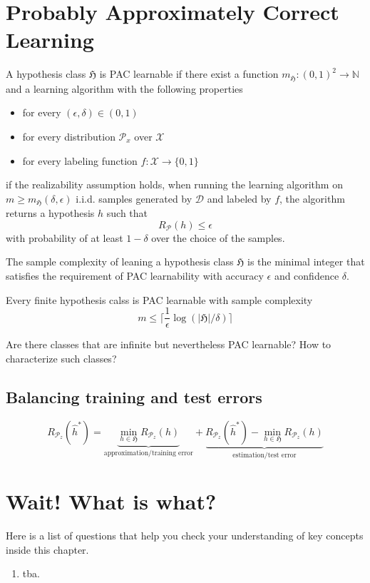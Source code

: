 \section{Probably Approximately Correct Learning}
    \begin{definition}
		A hypothesis class $\mathfrak{H}$ is PAC learnable if there exist a
		function $m_\mathfrak{H}: (0,1)^2 \to \mathbb{N}$ and a learning
		algorithm with the following properties
		\begin{itemize}
			\item for every $(\epsilon, \delta) \in (0,1)$
			\item for every distribution $\mathcal{P}_x$ over $\mathcal{X}$
			\item for every labeling function $f: \mathcal{X} \to \{0,1\}$
		\end{itemize}
		if the realizability assumption holds, when running the learning
		algorithm on $m \geq m_\mathfrak{H}(\delta, \epsilon)$ i.i.d. samples
		generated by $\mathcal{D}$ and labeled by $f$, the algorithm returns a
		hypothesis $h$ such that 
		$$
		R_\mathcal{P}(h) \leq \epsilon
		$$ 
		with probability of at least $1-\delta$ over the choice of the samples.
	\end{definition}

    \begin{definition}
		The sample complexity of leaning a hypothesis class $\mathfrak{H}$ is
		the minimal integer that satisfies the requirement of PAC learnability
		with accuracy $\epsilon$ and confidence $\delta$.
	\end{definition}
	\begin{coro}
		Every finite hypothesis calss is PAC learnable with sample complexity 
		$$
		m \leq \lceil \frac{1}{\epsilon} \log(|\mathfrak{H}|/\delta) \rceil
		$$
	\end{coro}
Are there classes that are infinite but nevertheless PAC learnable? How to
characterize such classes?
\subsection{Balancing training and test errors}
$$
	R_{\mathcal{P}_z}(\hat{h}^*) = \underbrace{\min_{h \in \mathfrak{H}} R_{\mathcal{P}_z}(h)}_{\text{approximation/training error}} + \underbrace{R_{\mathcal{P}_z}(\hat{h}^*) - \min_{h \in \mathfrak{H}} R_{\mathcal{P}_z}(h)}_{\text{estimation/test error}} 
	$$

\section*{Wait! What is what?}
Here is a list of questions that help you check your understanding of key
concepts inside this chapter.

\begin{enumerate}
    \item tba. 
\end{enumerate}

